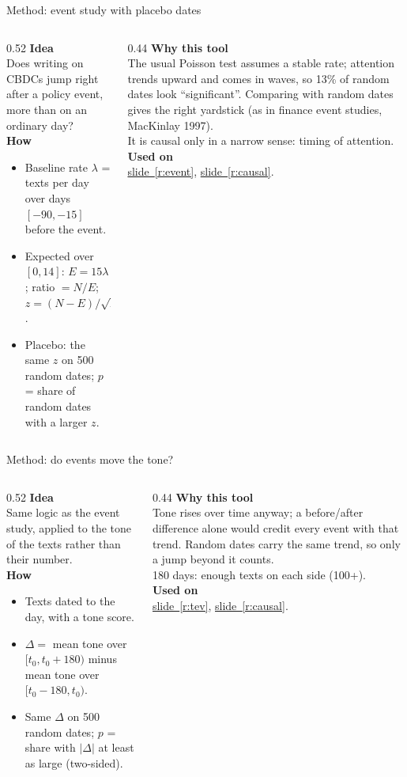 \documentclass[aspectratio=169,10pt]{beamer}
\newcommand{\usedon}[1]{\hyperref[#1]{\textcolor{c4}{slide~\ref*{#1}}}}
\newcommand{\mhead}[1]{\textcolor{c1}{\textbf{#1}}\\[1pt]}
\begin{document}
\begin{frame}{Method: event study with placebo dates}
\begin{columns}[T]
\begin{column}{0.52\textwidth}\footnotesize
\mhead{Idea}
Does writing on CBDCs jump right after a policy event, more than on an ordinary day?\\[4pt]
\mhead{How}
\begin{itemize}\setlength\itemsep{1pt}
\item Baseline rate $\lambda$ = texts per day over days $[-90,-15]$ before the event.
\item Expected over $[0,14]$: $E = 15\lambda$; ratio $= N/E$; $z = (N-E)/\sqrt{E}$.
\item \alert{Placebo}: the same $z$ on 500 random dates; $p$ = share of random dates with a larger $z$.
\end{itemize}
\end{column}
\begin{column}{0.44\textwidth}\footnotesize
\mhead{Why this tool}
The usual Poisson test assumes a stable rate; attention trends upward and comes in waves, so 13\% of random dates look ``significant''. Comparing with random dates gives the right yardstick (as in finance event studies, MacKinlay 1997).\\[3pt]
It is causal only in a narrow sense: timing of attention.\\[6pt]
\mhead{Used on}
\usedon{r:event}, \usedon{r:causal}.
\end{column}
\end{columns}
\end{frame}

\begin{frame}{Method: do events move the tone?}
\begin{columns}[T]
\begin{column}{0.52\textwidth}\footnotesize
\mhead{Idea}
Same logic as the event study, applied to the tone of the texts rather than their number.\\[4pt]
\mhead{How}
\begin{itemize}\setlength\itemsep{1pt}
\item Texts dated to the day, with a tone score.
\item $\Delta = $ mean tone over $[t_0, t_0+180)$ minus mean tone over $[t_0-180, t_0)$.
\item Same $\Delta$ on 500 random dates; $p$ = share with $|\Delta|$ at least as large (two-sided).
\end{itemize}
\end{column}
\begin{column}{0.44\textwidth}\footnotesize
\mhead{Why this tool}
Tone rises over time anyway; a before/after difference alone would credit every event with that trend. Random dates carry the same trend, so only a jump beyond it counts.\\[3pt]
180 days: enough texts on each side (100+).\\[6pt]
\mhead{Used on}
\usedon{r:tev}, \usedon{r:causal}.
\end{column}
\end{columns}
\end{frame}
\end{document}
